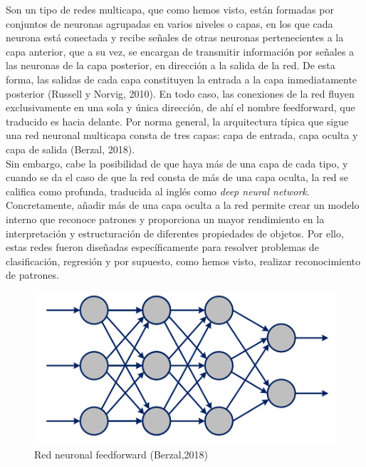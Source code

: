 Son un tipo de redes multicapa, que como hemos visto, están formadas por conjuntos de neuronas agrupadas en varios niveles o capas, en los que cada neurona está conectada y recibe señales de otras neuronas pertenecientes a la capa anterior, que a su vez, se encargan de transmitir información por señales a las neuronas de la capa posterior, en dirección a la salida de la red. De esta forma, las salidas de cada capa constituyen la entrada a la capa inmediatamente posterior (Russell y Norvig, 2010). En todo caso, las conexiones de la red fluyen exclusivamente en una sola y única dirección, de ahí el nombre feedforward, que traducido es hacia delante. Por norma general, la arquitectura típica que sigue una red neuronal multicapa consta de tres capas: capa de entrada, capa oculta y capa de salida (Berzal, 2018). \\

Sin embargo, cabe la posibilidad de que haya más de una capa de cada tipo, y cuando se da el caso de que la red consta de más de una capa oculta, la red se califica como profunda, traducida al inglés como \textit{deep neural network}. Concretamente, añadir más de una capa oculta a la red permite crear un modelo interno que reconoce patrones y proporciona un mayor rendimiento en la interpretación y estructuración de diferentes propiedades de objetos. Por ello, estas redes fueron diseñadas específicamente para resolver problemas de clasificación, regresión y por supuesto, como hemos visto, realizar reconocimiento de patrones.\\

\begin{figure}[h]
	\centering
	\includegraphics[width = 1 \textwidth]{Imagenes/Vectorial/feedforward.png}
	\caption{Red neuronal feedforward (Berzal,2018)}
	\label{fig:feedforward}
\end{figure}



